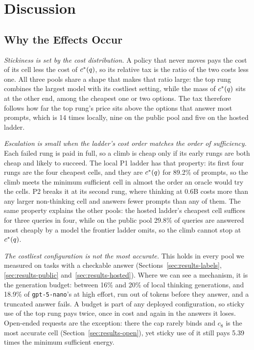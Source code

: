 \section{Discussion}
\label{sec:discussion}

\subsection{Why the Effects Occur}
\label{sec:why}

\emph{Stickiness is set by the cost distribution.} A policy that never moves
pays the cost of its cell less the cost of $c^{*}(q)$, so its relative tax
is the ratio of the two costs less one. All three pools share a shape that
makes that ratio large: the top rung combines the largest model with its
costliest setting, while the mass of $c^{*}(q)$ sits at the other end,
among the cheapest one or two options. The tax therefore follows how far
the top rung's price sits above the options that answer most prompts,
which is 14 times locally, nine on the public pool and five on the hosted
ladder.

\emph{Escalation is small when the ladder's cost order matches the order
of sufficiency.} Each failed rung is paid in full, so a climb is cheap only
if its early rungs are both cheap and likely to succeed. The local P1
ladder has that property: its first four rungs are the four cheapest cells,
and they are $c^{*}(q)$ for 89.2\% of prompts, so the climb meets the
minimum sufficient cell in almost the order an oracle would try the cells.
P2 breaks it at its second rung, where thinking at 0.6B costs more than any
larger non-thinking cell and answers fewer prompts than any of them. The
same property explains the other pools: the hosted ladder's cheapest cell
suffices for three queries in four, while on the public pool 29.8\% of
queries are answered most cheaply by a model the frontier ladder omits, so
the climb cannot stop at $c^{*}(q)$.

\emph{The costliest configuration is not the most accurate.} This holds in
every pool we measured on tasks with a checkable answer
(Sections~\ref{sec:results-labels}, \ref{sec:results-public}
and~\ref{sec:results-hosted}). Where we can see a mechanism, it is the
generation budget: between 16\% and 20\% of local thinking generations, and
18.9\% of \texttt{gpt-5-nano}'s at high effort, run out of tokens before
they answer, and a truncated answer fails. A budget is part of any deployed
configuration, so sticky use of the top rung pays twice, once in cost and
again in the answers it loses. Open-ended requests are the exception: there
the cap rarely binds and $c_8$ is the most accurate cell
(Section~\ref{sec:results-open}), yet sticky use of it still pays 5.39 times
the minimum sufficient energy.

